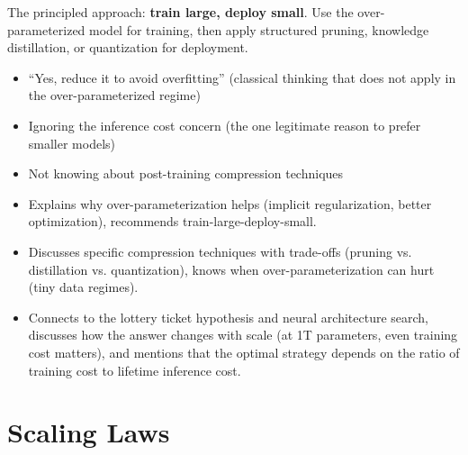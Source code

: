 \begin{interviewq}
The principled approach: \textbf{train large, deploy small}. Use the over-parameterized model for training, then apply structured pruning, knowledge distillation, or quantization for deployment.

\redflags
\begin{itemize}
    \item ``Yes, reduce it to avoid overfitting'' (classical thinking that does not apply in the over-parameterized regime)
    \item Ignoring the inference cost concern (the one legitimate reason to prefer smaller models)
    \item Not knowing about post-training compression techniques
\end{itemize}


\goodgreat
\begin{itemize}
    \item {} Explains why over-parameterization helps (implicit regularization, better optimization), recommends train-large-deploy-small.
    \item {} Discusses specific compression techniques with trade-offs (pruning vs. distillation vs. quantization), knows when over-parameterization can hurt (tiny data regimes).
    \item {} Connects to the lottery ticket hypothesis and neural architecture search, discusses how the answer changes with scale (at 1T parameters, even training cost matters), and mentions that the optimal strategy depends on the ratio of training cost to lifetime inference cost.
\end{itemize}

\end{interviewq}

\section{Scaling Laws}
\label{sec:scaling_laws}

